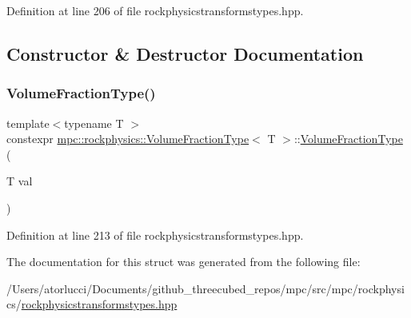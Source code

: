 Definition at line 206 of file rockphysicstransformstypes.\+hpp.



\subsection{Constructor \& Destructor Documentation}
\mbox{\label{structmpc_1_1rockphysics_1_1_volume_fraction_type_ad5e14aa452a7314daaa79c72d37c63a4}} 
\subsubsection{\texorpdfstring{Volume\+Fraction\+Type()}{VolumeFractionType()}}
{\footnotesize\ttfamily template$<$typename T $>$ \\
constexpr \mbox{\hyperlink{structmpc_1_1rockphysics_1_1_volume_fraction_type}{mpc\+::rockphysics\+::\+Volume\+Fraction\+Type}}$<$ T $>$\+::\mbox{\hyperlink{structmpc_1_1rockphysics_1_1_volume_fraction_type}{Volume\+Fraction\+Type}} (\begin{DoxyParamCaption}\item[{T}]{val }\end{DoxyParamCaption})\hspace{0.3cm}{\ttfamily [inline]}}



Definition at line 213 of file rockphysicstransformstypes.\+hpp.



The documentation for this struct was generated from the following file\+:\begin{DoxyCompactItemize}
\item 
/\+Users/atorlucci/\+Documents/github\+\_\+threecubed\+\_\+repos/mpc/src/mpc/rockphysics/\mbox{\hyperlink{rockphysicstransformstypes_8hpp}{rockphysicstransformstypes.\+hpp}}\end{DoxyCompactItemize}
